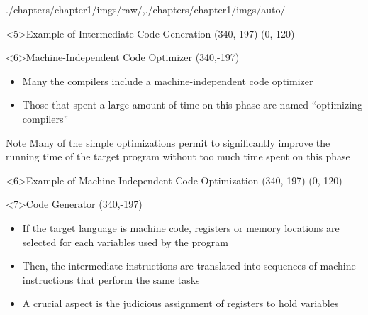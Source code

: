 \begin{graphicspathcontext}{{./chapters/chapter1/imgs/raw/},{./chapters/chapter1/imgs/auto/}}
\begin{bibunit}[apalike]
\begin{frame}<5>{Example of Intermediate Code Generation}
	\putat*(340,-197){}
	\putat(0,-120){}
\end{frame}

\begin{frame}<6>{{Machine-Independent Code} Optimizer}
	\putat*(340,-197){}
	\begin{minipage}{.8\linewidth}
		\vspace{.5cm}
		\begin{itemize}
		\item Many the compilers include a machine-independent code optimizer
		\item Those that spent a large amount of time on this phase are named ``optimizing compilers''
		\end{itemize}
		\vspace{.5cm}
		\begin{block}{Note}
			Many of the simple optimizations permit to significantly improve the running time of the target program without too much time spent on this phase
		\end{block}
	\end{minipage}
\end{frame}


\begin{frame}<6>{Example of Machine-Independent Code Optimization}
	\putat*(340,-197){}
	\putat(0,-120){}
\end{frame}

\begin{frame}<7>{Code Generator}
	\putat*(340,-197){}
	\begin{minipage}{.8\linewidth}
		\vspace{.5cm}
		\begin{itemize}
		\item If the target language is machine code, registers or memory locations are selected for each variables used by the program
		\item Then, the intermediate instructions are translated into sequences of machine instructions that perform the same tasks
		\vspace{.5cm}
		\item A crucial aspect is the judicious assignment of registers to hold variables
		\end{itemize}
	\end{minipage}
\end{frame}


\end{bibunit}
\end{graphicspathcontext}
